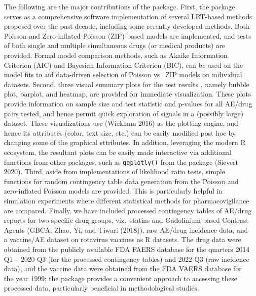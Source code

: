 The following are the major contributions of the  package. First, the package serves as a comprehensive software implementation of several LRT-based methods proposed over the past decade, including some recently developed methods. Both Poisson and Zero-inflated Poisson (ZIP) based models are implemented, and tests of both single and multiple simultaneous drugs (or medical products) are provided. Formal model comparison methods, such as Akaike Information Criterion (AIC) and Bayesian Information Criterion (BIC), can be used on the model fits to aid data-driven selection of Poisson vs.~ZIP models on individual datasets. Second, three visual summary plots for the test results , namely bubble plot, barplot, and heatmap, are provided for immediate visualization. These plots provide information on sample size and test statistic and p-values for all AE/drug pairs tested, and hence permit quick exploration of signals in a (possibly large) dataset. These visualizations use  (Wickham 2016) as the plotting engine, and hence its attributes (color, text size, etc.) can be easily modified post hoc by changing some of the  graphical sttributes. In addition, leveraging the modern R ecosystem, the resultant plots can be easily made interactive via additional functions from other packages, such as \texttt{ggplotly()} from the package  (Sievert 2020). Third, aside from implementations of likelihood ratio tests, simple functions for random contingency table data generation from the Poisson and zero-inflated Poisson models are provided. This is particularly helpful in simulation experiments where different statistical methods for pharmacovigilance are compared. Finally, we have included processed contingency tables of AE/drug reports for two specific drug groups, viz.~statins and Gadolinium-based Contrast Agents (GBCA; Zhao, Yi, and Tiwari (2018)), raw AE/drug incidence data, and a vaccine/AE dataset on rotavirus vaccines as R datasets. The drug data were obtained from the publicly available FDA FAERS database for the quarters 2014 Q1 -- 2020 Q3 (for the processed contingency tables) and 2022 Q3 (raw incidence data), and the vaccine data were obtained from the FDA VAERS database for the year 1999; the package provides a convenient approach to accessing these processed data, particularly beneficial in methodological studies.

